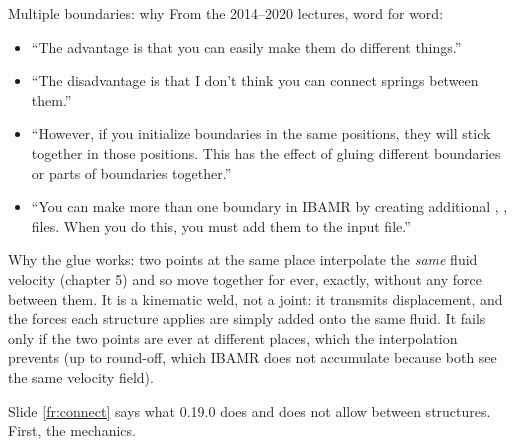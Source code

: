 \documentclass[aspectratio=169,11pt]{beamer}
\begin{document}
\begin{frame}{Multiple boundaries: why}
\label{fr:multi}
\small From the 2014--2020 lectures, word for word:
\begin{itemize}
  \item ``The advantage is that you can easily make them do different things.''
  \item ``The disadvantage is that I don't think you can connect springs between them.''
  \item ``However, if you initialize boundaries in the same positions, they will stick together in those positions. This has the effect of gluing different boundaries or parts of boundaries together.''
  \item ``You can make more than one boundary in IBAMR by creating additional , ,  files. When you do this, you must add them to the input file.''
\end{itemize}
\vspace{1mm}
\begin{punchbox}
\small Why the glue works: two points at the same place interpolate the \emph{same} fluid velocity (chapter 5) and so move together for ever, exactly, without any force between them. It is a kinematic weld, not a joint: it transmits displacement, and the forces each structure applies are simply added onto the same fluid. It fails only if the two points are ever at different places, which the interpolation prevents (up to round-off, which IBAMR does not accumulate because both see the same velocity field).
\end{punchbox}
\vspace{1mm}
\small Slide \ref{fr:connect} says what 0.19.0 does and does not allow between structures. First, the mechanics.
\end{frame}
\end{document}
